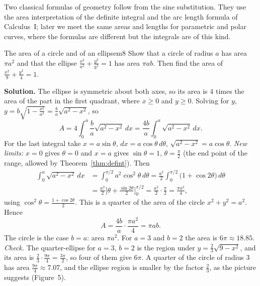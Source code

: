 \documentclass[11pt]{article}
\begin{document}
Two classical formulas of geometry follow from the sine substitution. They use the area interpretation of the definite integral and the arc length formula of Calculus~I; later we meet the same areas and lengths for parametric and polar curves, where the formulas are different but the integrals are of this kind.

\begin{exmp}{The area of a circle and of an ellipse}{m8}
Show that a circle of radius $a$ has area $\pi a^2$ and that the ellipse $\frac{x^2}{a^2}+\frac{y^2}{b^2}=1$ has area $\pi ab$. Then find the area of $\frac{x^2}9+\frac{y^2}4=1$.

\textbf{Solution.} The ellipse is symmetric about both axes, so its area is $4$ times the area of the part in the first quadrant, where $x\ge0$ and $y\ge0$. Solving for $y$, $y=b\sqrt{1-\frac{x^2}{a^2}}=\frac ba\sqrt{a^2-x^2}$, so
\[A=4\int_0^a\frac ba\sqrt{a^2-x^2}\,dx=\frac{4b}a\int_0^a\sqrt{a^2-x^2}\,dx .\]
For the last integral take $x=a\sin\theta$, $dx=a\cos\theta\,d\theta$, $\sqrt{a^2-x^2}=a\cos\theta$. \emph{New limits:} $x=0$ gives $\theta=0$ and $x=a$ gives $\sin\theta=1$, $\theta=\frac\pi2$ (the end point of the range, allowed by Theorem~\ref{thm:defint}). Then
\begin{align*}
\int_0^a\sqrt{a^2-x^2}\,dx&=\int_0^{\pi/2}a^2\cos^2\theta\,d\theta=\frac{a^2}2\int_0^{\pi/2}\big(1+\cos2\theta\big)\,d\theta\\
&=\frac{a^2}2\Big[\theta+\frac{\sin2\theta}2\Big]_0^{\pi/2}=\frac{a^2}2\cdot\frac\pi2=\frac{\pi a^2}4 ,
\end{align*}
using $\cos^2\theta=\frac{1+\cos2\theta}2$. This is a quarter of the area of the circle $x^2+y^2=a^2$. Hence
\[A=\frac{4b}a\cdot\frac{\pi a^2}4=\pi ab .\]
The circle is the case $b=a$: area $\pi a^2$. For $a=3$ and $b=2$ the area is $6\pi\approx18.85$.
\emph{Check.} The quarter-ellipse for $a=3$, $b=2$ is the region under $y=\frac23\sqrt{9-x^2}$, and its area is $\frac23\cdot\frac{9\pi}4=\frac{3\pi}2$, so four of them give $6\pi$. A quarter of the circle of radius $3$ has area $\frac{9\pi}4\approx7.07$, and the ellipse region is smaller by the factor $\frac23$, as the picture suggests (Figure~5).


\end{exmp}
\end{document}
